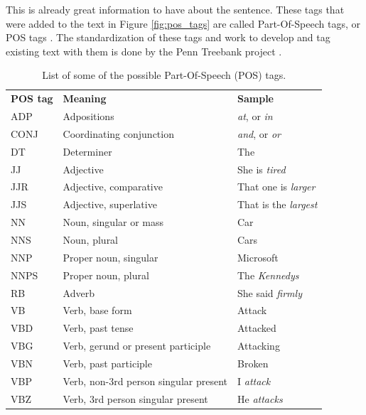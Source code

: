 \documentclass[11pt,a4paper,openright]{memoir}
\begin{document}
This is already great information to have about the sentence. These tags that were added to the text in Figure \ref{fig:pos_tags} are called Part-Of-Speech tags, or POS tags \cite{Jurafsky:2000:SLP:555733}. The standardization of these tags and work to develop and tag existing text with them is done by the Penn Treebank project \cite{Marcus:1993:BLA:972470.972475}.

\begin{table}[!htbp]
  \centering
    \begin{tabular}{lll}
      \textbf{POS tag}     & \textbf{Meaning}      & \textbf{Sample} \\
      ADP  & Adpositions                           & \emph{at}, or \emph{in}        \\  
      CONJ & Coordinating conjunction              & \emph{and}, or \emph{or} \\
      DT   & Determiner                            & The                     \\
      JJ   & Adjective                             & She is \emph{tired}     \\
      JJR  & Adjective, comparative                & That one is \emph{larger} \\
      JJS  & Adjective, superlative                & That is the \emph{largest}     \\
      NN   & Noun, singular or mass                & Car                     \\
      NNS  & Noun, plural                          & Cars                    \\
      NNP  & Proper noun, singular                 & Microsoft               \\
      NNPS & Proper noun, plural                   & The \emph{Kennedys}            \\
      RB   & Adverb                                & She said \emph{firmly}         \\
      VB   & Verb, base form                       & Attack                  \\
      VBD  & Verb, past tense                      & Attacked                \\
      VBG  & Verb, gerund or present participle    & Attacking               \\
      VBN  & Verb, past participle                 & Broken                  \\
      VBP  & Verb, non-3rd person singular present & I \emph{attack}                \\
      VBZ  & Verb, 3rd person singular present     & He \emph{attacks}               
    \end{tabular}
  \caption[List of some of the possible Part-Of-Speech (POS) tags.]{List of some of the possible Part-Of-Speech (POS) tags.}
  \label{tab:pos_tags_list}
\end{table}
\end{document}
